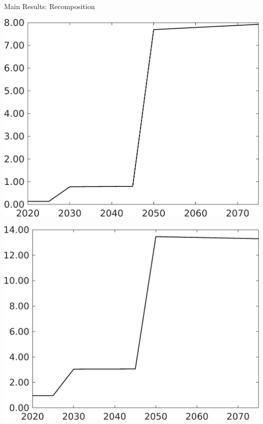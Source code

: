 \documentclass[11pt,aspectratio=169]{beamer}
\begin{document}
\begin{frame}{Main Results: Recomposition}
	\begin{minipage}[]{0.32\textwidth}
		\includegraphics[width=1\textwidth]{../codding_model/own_basedOnFried/optimalPol_elastS_DisuSci/figures/all_1705/Single_OPT_T_NoTaus_GFF_spillover0_sep1_BN0_ineq0_red0_etaa0.79.png}
	\end{minipage}
\begin{minipage}[]{0.32\textwidth}
	\includegraphics[width=1\textwidth]{../codding_model/own_basedOnFried/optimalPol_elastS_DisuSci/figures/all_1705/Single_OPT_T_NoTaus_sgsff_spillover0_sep1_BN0_ineq0_red0_etaa0.79.png}

\end{minipage}
\end{frame}
\end{document}
